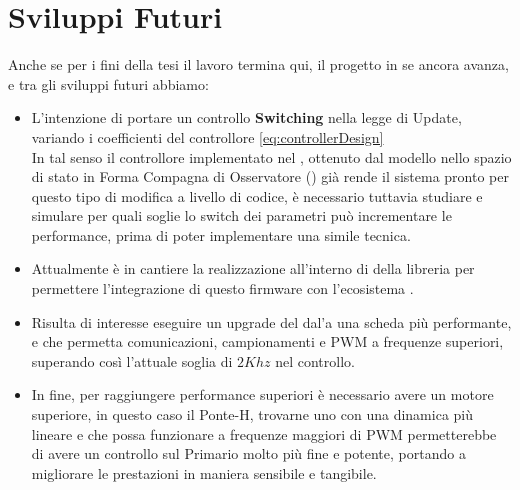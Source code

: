 \section*{Sviluppi Futuri}
Anche se per i fini della tesi il lavoro termina qui, il progetto in se ancora avanza, e tra gli sviluppi futuri abbiamo:
\begin{itemize}
	\item L'intenzione di portare un controllo \textbf{Switching} nella legge di Update, variando i coefficienti del controllore \ref{eq:controllerDesign}\\
	      In tal senso il controllore implementato nel \microControllore, ottenuto dal modello nello spazio di stato in Forma Compagna di Osservatore (\cite{FormeCanoniche}) già rende il sistema pronto per questo tipo di modifica a livello di codice, è necessario tuttavia studiare e simulare per quali soglie lo switch dei parametri può incrementare le performance, prima di poter implementare una simile tecnica.
	\item Attualmente è in cantiere la realizzazione all'interno di \MARTe della libreria \cite*{EMP} per permettere l'integrazione di questo firmware con l'ecosistema \MARTe.
	\item Risulta di interesse eseguire un upgrade del \microControllore dal'\ArduinoUno a una scheda più performante, e che permetta comunicazioni, campionamenti e PWM a frequenze superiori, superando così l'attuale soglia di $ 2Khz $ nel controllo.
	\item In fine, per raggiungere performance superiori è necessario avere un motore superiore, in questo caso il Ponte-H, trovarne uno con una dinamica più lineare e che possa funzionare a frequenze maggiori di PWM permetterebbe di avere un controllo sul Primario molto più fine e potente, portando a migliorare le prestazioni in maniera sensibile e tangibile.
\end{itemize}





